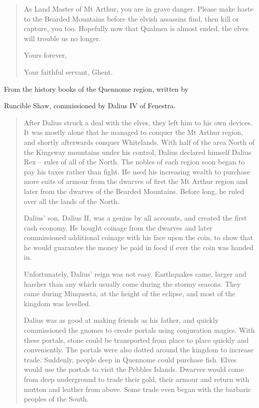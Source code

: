 \begin{multicols}{2}
\begin{quotation}
	As Land Master of Mt Arthur, you are in grave danger.  Please make haste to the Bearded Mountains before the elvish assassins find, then kill or capture, you too.  Hopefully now that Qualmea is almost ended, the elves will trouble us no longer.

	Yours forever,

	Your faithful servant, Ghent.

\end{quotation}

From the history books of the Quennome region, written by

 Runcible Shaw, commissioned by Dalius IV of Fenestra.

\begin{quotation}

After Dalius struck a deal with the elves, they left him to his own devices.  It was mostly alone that he managed to conquer the Mt Arthur region, and shortly afterwards conquer Whitelands.  With half of the area North of the Kingsway mountains under his control, Dalius declared himself Dalius Rex -- ruler of all of the North.  The nobles of each region soon began to pay his taxes rather than fight.  He used his increasing wealth to purchase more suits of armour from the dwarves of first the Mt Arthur region and later from the dwarves of the Bearded Mountains.  Before long, he ruled over all the lands of the North.

	Dalius' son, Dalius II, was a genius by all accounts, and created the first cash economy.  He bought coinage from the dwarves and later commissioned additional coinage with his face upon the coin, to show that he would guarantee the money be paid in food if ever the coin was handed in.

	Unfortunately, Dalius' reign was not easy.  Earthquakes came, larger and harsher than any which usually come during the stormy seasons.  They came during Minquesta, at the height of the eclipse, and most of the kingdom was levelled.

	Dalius was as good at making friends as his father, and quickly commissioned the gnomes to create portals using conjuration magics.  With these portals, stone could be transported from place to place quickly and conveniently.  The portals were also dotted around the kingdom to increase trade.  Suddenly, people deep in Quennome could purchase fish.  Elves would use the portals to visit the Pebbles Islands.  Dwarves would come from deep underground to trade their gold, their armour and return with mutton and leather from above.  Some trade even began with the barbaric peoples of the South.


\end{quotation}
\end{multicols}
